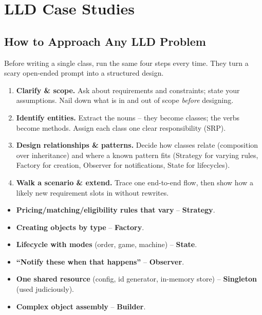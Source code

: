 \chapter{LLD Case Studies}

\section{How to Approach Any LLD Problem}
\label{sec:cases-intro}

Before writing a single class, run the same four steps every time. They
turn a scary open-ended prompt into a structured design.

\begin{ideabox}
\begin{enumerate}
  \item \textbf{Clarify \& scope.} Ask about requirements and
        constraints; state your assumptions. Nail down what is in and out
        of scope \emph{before} designing.
  \item \textbf{Identify entities.} Extract the nouns -- they become
        classes; the verbs become methods. Assign each class one clear
        responsibility (SRP).
  \item \textbf{Design relationships \& patterns.} Decide how classes
        relate (composition over inheritance) and where a known pattern
        fits (Strategy for varying rules, Factory for creation, Observer
        for notifications, State for lifecycles).
  \item \textbf{Walk a scenario \& extend.} Trace one end-to-end flow,
        then show how a likely new requirement slots in without rewrites.
\end{enumerate}
\end{ideabox}

\begin{patternbox}
\begin{itemize}
  \item \textbf{Pricing/matching/eligibility rules that vary} --
        \textbf{Strategy}.
  \item \textbf{Creating objects by type} -- \textbf{Factory}.
  \item \textbf{Lifecycle with modes} (order, game, machine) --
        \textbf{State}.
  \item \textbf{``Notify these when that happens''} -- \textbf{Observer}.
  \item \textbf{One shared resource} (config, id generator, in-memory
        store) -- \textbf{Singleton} (used judiciously).
  \item \textbf{Complex object assembly} -- \textbf{Builder}.
\end{itemize}
\end{patternbox}

